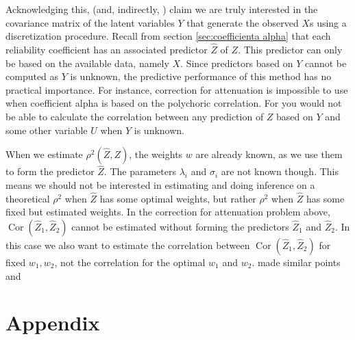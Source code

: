 \documentclass{article}
\theoremstyle{plain}
\theoremstyle{plain}
\theoremstyle{definition}
\theoremstyle{remark}
\theoremstyle{definition}
\theoremstyle{plain}
\theoremstyle{plain}
\theoremstyle{definition}
\DeclareMathOperator{\Cor}{Cor}
\begin{document}
Acknowledging this, \citet[][p.2]{Gadermann2012-jl} (and, indirectly, \citet{Zumbo2007-ap}) claim we are truly interested in the covariance matrix of the latent variables $Y$ that generate the observed $X$s using a discretization procedure. Recall from section \ref{sec:coefficienta alpha} that each reliability coefficient has an associated predictor $\hat{Z}$ of $Z$. This predictor can only be based on the available data, namely $X$. Since predictors based on $Y$ cannot be computed as $Y$ is unknown, the predictive performance of this method has no practical importance. For instance, correction for attenuation is impossible to use when coefficient alpha is based on the polychoric correlation. For you would not be able to calculate the correlation between any prediction of $Z$ based on $Y$ and some other variable $U$ when $Y$ is unknown.

When we estimate $\rho^{2}(\hat{Z},Z)$, the weights
$w$ are already known, as we use them to form the predictor $\hat{Z}$.
The parameters $\lambda_{i}$ and $\sigma_{i}$ are not known though.
This means we should not be interested in estimating and doing inference
on a theoretical $\rho^{2}$ when $\hat{Z}$ has some optimal
weights, but rather $\rho^{2}$ when $\hat{Z}$ has some fixed
but estimated weights. In the correction for attenuation problem
above, $\Cor(\hat{Z}_{1},\hat{Z}_{2})$ cannot
be estimated without forming the predictors $\hat{Z}_{1}$ and
$\hat{Z}_{2}$. In this case we also want to estimate the correlation
between $\Cor(\hat{Z}_{1},\hat{Z}_{2})$ for fixed
$w_{1},w_{2}$, not the correlation for the optimal $w_{1}$ and $w_{2}$. \citet{Chalmers2018-fj} made similar points and 

\section{Appendix}
\end{document}
